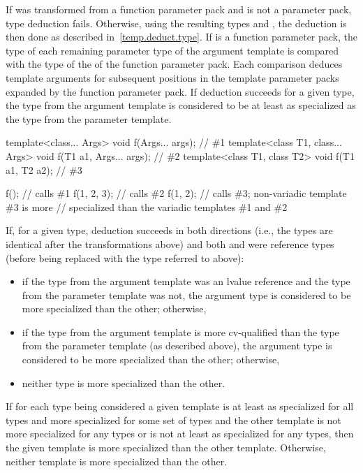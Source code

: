\pnum
If  was transformed from a function parameter pack and  is not
a parameter pack, type deduction fails. Otherwise, using
the resulting types
and
,
the deduction is then done as described in~\ref{temp.deduct.type}.
If  is a function parameter pack, the type  of each remaining
parameter type of the argument template is compared with the type  of
the  of the function parameter pack. Each comparison
deduces template arguments for subsequent positions in the template parameter
packs expanded by the function parameter pack.
If deduction succeeds for a given type,
the type from the argument template is considered to be at least as specialized
as the type from the parameter template.
\enterexample
\begin{codeblock}
template<class... Args>           void f(Args... args);           // \#1
template<class T1, class... Args> void f(T1 a1, Args... args);    // \#2
template<class T1, class T2>      void f(T1 a1, T2 a2);           // \#3

f();                  // calls \#1
f(1, 2, 3);           // calls \#2
f(1, 2);              // calls \#3; non-variadic template \#3 is more
                      // specialized than the variadic templates \#1 and \#2
\end{codeblock}
\exitexample

\pnum
If, for a given type, deduction succeeds in both directions (i.e., the
types are identical after the transformations above)
and both  and  were reference types (before being replaced with the
type referred to above):

\begin{itemize}
\item if the type from the argument template was an lvalue reference and the type
from the parameter template was not, the argument type is considered to be
more specialized than the other; otherwise,

\item if the type from
the argument template is more cv-qualified than the type from the
parameter template (as described above), the argument type is considered to be
more specialized than the other; otherwise,

\item neither type is more specialized than the other.
\end{itemize}

\pnum
If for each type being considered a given template is at least as specialized
for all types and more specialized for some set of types and the
other template is not more specialized for any types or is not
at least as specialized for any types, then
the given template is more specialized than the other template.
Otherwise, neither template is more specialized than the other.

